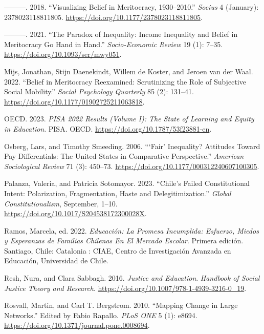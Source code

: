 \documentclass[
]{article}
\newlength{\cslhangindent}
\newenvironment{CSLReferences}[2] %
 {\begin{list}{}{%
  \setlength{\itemindent}{0pt}
  \setlength{\leftmargin}{0pt}
  \setlength{\parsep}{0pt}
  \ifodd #1
   \setlength{\leftmargin}{\cslhangindent}
   \setlength{\itemindent}{-1\cslhangindent}
  \fi
  \setlength{\itemsep}{#2\baselineskip}}}
 {\end{list}}
\begin{document}
\begin{CSLReferences}{1}{0}
---------. 2018. {``Visualizing {Belief} in {Meritocracy},
1930--2010.''} \emph{Socius} 4 (January): 2378023118811805.
\url{https://doi.org/10.1177/2378023118811805}.

---------. 2021. {``The Paradox of Inequality: Income Inequality and
Belief in Meritocracy Go Hand in Hand.''} \emph{Socio-Economic Review}
19 (1): 7--35. \url{https://doi.org/10.1093/ser/mwy051}.

Mijs, Jonathan, Stijn Daenekindt, Willem de Koster, and Jeroen van der
Waal. 2022. {``Belief in {Meritocracy Reexamined}: {Scrutinizing} the
{Role} of {Subjective Social Mobility}.''} \emph{Social Psychology
Quarterly} 85 (2): 131--41.
\url{https://doi.org/10.1177/01902725211063818}.

OECD. 2023. \emph{{PISA} 2022 {Results} ({Volume I}): {The State} of
{Learning} and {Equity} in {Education}}. {PISA}. OECD.
\url{https://doi.org/10.1787/53f23881-en}.

Osberg, Lars, and Timothy Smeeding. 2006. {``{`{Fair}'} {Inequality}?
{Attitudes} Toward {Pay Differentials}: {The United States} in
{Comparative Perspective}.''} \emph{American Sociological Review} 71
(3): 450--73. \url{https://doi.org/10.1177/000312240607100305}.

Palanza, Valeria, and Patricia Sotomayor. 2023. {``Chile's Failed
Constitutional Intent: {Polarization}, Fragmentation, Haste and
Delegitimization.''} \emph{Global Constitutionalism}, September, 1--10.
\url{https://doi.org/10.1017/S204538172300028X}.

Ramos, Marcela, ed. 2022. \emph{Educaci{ó}n: {La} Promesa Incumplida:
Esfuerzo, Miedos y Esperanzas de Familias Chilenas En El Mercado
Escolar}. Primera edici{ó}n. Santiago, Chile: Catalonia : CIAE, Centro
de Investigaci{ó}n Avanzada en Educaci{ó}n, Universidad de Chile.

Resh, Nura, and Clara Sabbagh. 2016. \emph{Justice and Education}.
\emph{Handbook of Social Justice Theory and Research}.
\url{https://doi.org/10.1007/978-1-4939-3216-0_19}.

Rosvall, Martin, and Carl T. Bergstrom. 2010. {``Mapping {Change} in
{Large Networks}.''} Edited by Fabio Rapallo. \emph{PLoS ONE} 5 (1):
e8694. \url{https://doi.org/10.1371/journal.pone.0008694}.


\end{CSLReferences}
\end{document}
